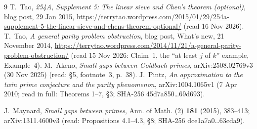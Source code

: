 \documentclass[11pt]{amsart}
\theoremstyle{definition}
\theoremstyle{remark}
\begin{document}
\begin{thebibliography}{9}
 T.~Tao, \emph{254A, Supplement 5: The linear sieve and Chen's theorem (optional)}, blog post, 29 Jan 2015, \url{https://terrytao.wordpress.com/2015/01/29/254a-supplement-5-the-linear-sieve-and-chens-theorem-optional/} (read 16 Nov 2026).
 T.~Tao, \emph{A general parity problem obstruction}, blog
  post, What's new, 21 November 2014,
  \url{https://terrytao.wordpress.com/2014/11/21/a-general-parity-problem-obstruction/}
  (read 15 Nov 2026: Claim~1, the ``at least $j$ of $k$'' example, Example~4).
 M.~Akeno, \emph{Small gaps between Goldbach primes},
  arXiv:2508.02769v3 (30 Nov 2025) (read: \S5, footnote~3, p.~38).
 J.~Pintz, \emph{An approximation to the twin prime conjecture and the parity phenomenon}, arXiv:1004.1065v1 (7 Apr 2010; read in full: Theorems 1--7, \S3; SHA-256 45d7a850\ldots69d693).

 J.~Maynard, \emph{Small gaps between primes}, Ann. of Math. (2) \textbf{181} (2015), 383--413; arXiv:1311.4600v3 (read: Propositions 4.1--4.3, \S8; SHA-256 dce1a7a0\ldots63cda9).

\end{thebibliography}

\appendix
\end{document}
